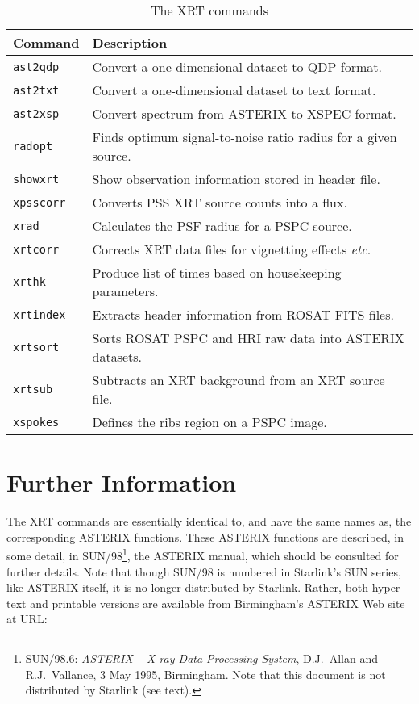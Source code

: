 \documentclass[twoside,11pt]{article}
\newcommand{\xlabel}[1]{}
\renewcommand{\_}{\texttt{\symbol{95}}}
\begin{document}
\begin{table}[htbp]

\begin{center}
\begin{tabular}{ll}
Command  & Description \\ \hline
{\tt ast2qdp}  & Convert a one-dimensional dataset to QDP format. \\
{\tt ast2txt}  & Convert a one-dimensional dataset to text format. \\
{\tt ast2xsp}  & Convert spectrum from ASTERIX to XSPEC format. \\
{\tt radopt}   & Finds optimum signal-to-noise ratio radius for a given
 source. \\
{\tt showxrt}  & Show observation information stored in header file. \\
{\tt xpsscorr} & Converts PSS XRT source counts into a flux. \\
{\tt xrad}     & Calculates the PSF radius for a PSPC source. \\
{\tt xrtcorr}  & Corrects XRT data files for vignetting effects \emph{etc}. \\
{\tt xrthk}    & Produce list of times based on housekeeping parameters. \\
{\tt xrtindex} & Extracts header information from ROSAT FITS files. \\
{\tt xrtsort}  & Sorts ROSAT PSPC and HRI raw data into ASTERIX datasets. \\
{\tt xrtsub}   & Subtracts an XRT background from an XRT source file. \\
{\tt xspokes}  & Defines the ribs region on a PSPC image. \\
\end{tabular}
\end{center}

\begin{quote}
\caption{The XRT commands \label{XRTCOMMANDS} }
\end{quote}

\end{table}


\section{\xlabel{INFO}\label{INFO}Further Information}

The XRT commands are essentially identical to, and have the same names as,
the corresponding ASTERIX functions.  These ASTERIX functions are
described, in some detail, in SUN/98\footnote{SUN/98.6: {\it ASTERIX --
X-ray Data Processing System},  D.J.~Allan and R.J.~Vallance, 3 May 1995,
Birmingham.  Note that this document is not distributed by Starlink (see
text).}, the ASTERIX manual, which should be consulted for further details.
Note that though SUN/98 is numbered in Starlink's SUN series, like ASTERIX
itself, it is no longer distributed by Starlink.  Rather, both hyper-text
and printable versions are available from Birmingham's ASTERIX Web site
at URL:
\end{document}
